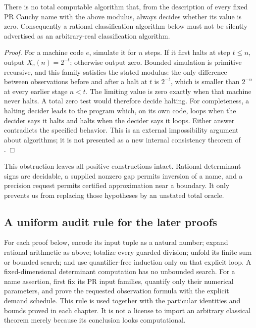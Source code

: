 \begin{proposition}\label{found:no-zero-test}
There is no total computable algorithm that, from the description of every fixed PR Cauchy name with the above modulus, always decides whether its value is zero. Consequently a rational classification algorithm below must not be silently advertised as an arbitrary-real classification algorithm.
\end{proposition}
\begin{proof}
For a machine code $e$, simulate it for $n$ steps. If it first halts at step $t\le n$, output $X_e(n)=2^{-t}$; otherwise output zero. Bounded simulation is primitive recursive, and this family satisfies the stated modulus: the only difference between observations before and after a halt at $t$ is $2^{-t}$, which is smaller than $2^{-n}$ at every earlier stage $n<t$. The limiting value is zero exactly when that machine never halts. A total zero test would therefore decide halting. For completeness, a halting decider leads to the program which, on its own code, loops when the decider says it halts and halts when the decider says it loops. Either answer contradicts the specified behavior. This is an external impossibility argument about algorithms; it is not presented as a new internal consistency theorem of \ipra.
\end{proof}

This obstruction leaves all positive constructions intact. Rational determinant signs are decidable, a supplied nonzero gap permits inversion of a name, and a precision request permits certified approximation near a boundary. It only prevents us from replacing those hypotheses by an unstated total oracle.

\subsection{A uniform audit rule for the later proofs}

For each proof below, encode its input tuple as a natural number; expand rational arithmetic as above; totalize every guarded division; unfold its finite sum or bounded search; and use quantifier-free induction only on that explicit loop. A fixed-dimensional determinant computation has no unbounded search. For a name assertion, first fix its PR input families, quantify only their numerical parameters, and prove the requested observation formula with the explicit demand schedule. This rule is used together with the particular identities and bounds proved in each chapter. It is not a license to import an arbitrary classical theorem merely because its conclusion looks computational.
